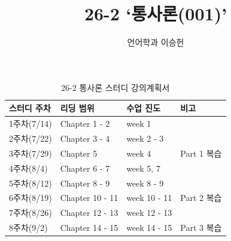 \documentclass{article}
\begin{document}
\title{26-2 `통사론(001)'}
\author{언어학과 이승헌}
\maketitle
\begin{table}[H]
    \caption{26-2 통사론 스터디 강의계획서}
    \begin{center}
    \renewcommand{\arraystretch}{2.2}
    \begin{tabular}{|C{1.8cm}|C{2.7cm}|C{3.5cm}|C{2cm}|} \hline
    스터디 주차 & 리딩 범위 & 수업 진도 & 비고 \\ \hline
    1주차(7/14) & Chapter 1 - 2 & week 1 & \\ \hline
    2주차(7/22) & Chapter 3 - 4 & week 2 - 3 & \\ \hline
    3주차(7/29) & Chapter 5 & week 4 & Part 1 복습 \\ \hline
    4주차\newline(8/4) & Chapter 6 - 7 & week 5, 7 & \\ \hline
    5주차(8/12) & Chapter 8 - 9 & week 8 - 9 & \\ \hline
    6주차(8/19) & Chapter 10 - 11 & week 10 - 11 & Part 2 복습 \\ \hline
    7주차(8/26) & Chapter 12 - 13 & week 12 - 13 & \\ \hline
    8주차\newline(9/2) & Chapter 14 - 15 & week 14 - 15 & Part 3 복습 \\ \hline
    \end{tabular}
    \end{center}
\end{table}
\end{document}
